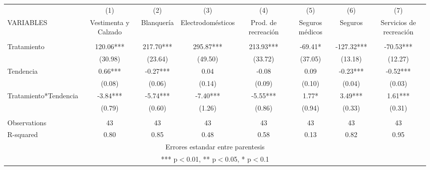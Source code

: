 \documentclass[]{article}
\begin{document}
\begin{tabular}{lccccccc} \hline
 & (1) & (2) & (3) & (4) & (5) & (6) & (7) \\
VARIABLES & Vestimenta y Calzado & Blanquería & Electrodomésticos & Prod. de recreación & Seguros médicos & Seguros & Servicios de recreación \\ \hline
 &  &  &  &  &  &  &  \\
Tratamiento & 120.06*** & 217.70*** & 295.87*** & 213.93*** & -69.41* & -127.32*** & -70.53*** \\
 & (30.98) & (23.64) & (49.50) & (33.72) & (37.05) & (13.18) & (12.27) \\
Tendencia & 0.66*** & -0.27*** & 0.04 & -0.08 & 0.09 & -0.23*** & -0.52*** \\
 & (0.08) & (0.06) & (0.14) & (0.09) & (0.10) & (0.04) & (0.03) \\
Tratamiento*Tendencia & -3.84*** & -5.74*** & -7.40*** & -5.55*** & 1.77* & 3.49*** & 1.61*** \\
 & (0.79) & (0.60) & (1.26) & (0.86) & (0.94) & (0.33) & (0.31) \\
 &  &  &  &  &  &  &  \\
Observations & 43 & 43 & 43 & 43 & 43 & 43 & 43 \\
 R-squared & 0.80 & 0.85 & 0.48 & 0.58 & 0.13 & 0.82 & 0.95 \\ \hline
\multicolumn{8}{c}{ Errores estandar entre parentesis} \\
\multicolumn{8}{c}{ *** p$<$0.01, ** p$<$0.05, * p$<$0.1} \\
\end{tabular}
\end{document}

